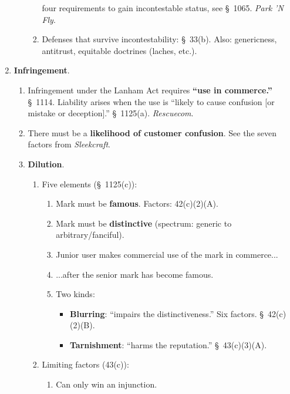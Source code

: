 \begin{enumerate}
\begin{enumerate}
\begin{enumerate}
            four requirements to gain incontestable status, see \S\ 1065.  
            \emph{Park 'N Fly}.
            \item Defenses that survive incontestability: \S\ 33(b). Also: 
            genericness, antitrust, equitable doctrines (laches, etc.).
        \end{enumerate}
    \end{enumerate}
    \item \textbf{Infringement}.
    \begin{enumerate}
        \item Infringement under the Lanham Act requires \textbf{``use in 
        commerce.''} \S\ 1114.  Liability arises when the use is ``likely to 
        cause confusion [or mistake or deception].'' \S\ 1125(a).  
        \emph{Rescuecom}.
        \item There must be a \textbf{likelihood of customer confusion}. See 
        the seven factors from \emph{Sleekcraft}.
        \item \textbf{Dilution}.
        \begin{enumerate}
            \item Five elements (\S\ 1125(c)):
            \begin{enumerate}
                \item Mark must be \textbf{famous}. Factors: 42(c)(2)(A).
                \item Mark must be \textbf{distinctive} (spectrum: generic to 
                arbitrary/fanciful).
                \item Junior user makes commercial use of the mark in 
                commerce...
                \item ...after the senior mark has become famous.
                \item Two kinds:
                \begin{itemize}
                    \item \textbf{Blurring}: ``impairs the distinctiveness.'' 
                    Six factors. \S\ 42(c)(2)(B).
                    \item \textbf{Tarnishment}: ``harms the reputation.'' \S\ 
                    43(c)(3)(A).
                \end{itemize}
            \end{enumerate}
            \item Limiting factors (43(c)):
            \begin{enumerate}
                \item Can only win an injunction.

\end{enumerate}
\end{enumerate}
\end{enumerate}
\end{enumerate}
